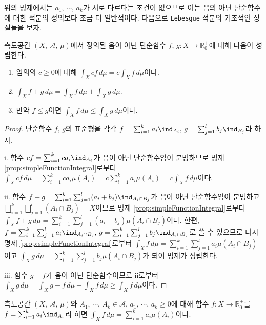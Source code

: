 위의 명제에서는 $a_1,\,\cdots,\,a_k$가 서로 다르다는 조건이 없으므로 이는 음의 아닌 단순함수에 대한 적분의 정의보다 조금 더 일반적이다. 다음으로 \texttt{Lebesgue} 적분의 기초적인 성질들을 보자.

\begin{proposition}
    측도공간 $(X,\,\mathcal{A},\,\mu)$에서 정의된 음이 아닌 단순함수 $f,\,g:X\to\mathbb{R}^+_0$에 대해 다음이 성립한다.
    \begin{enumerate}
        \item 임의의 $c\geq0$에 대해 $\int_Xcf\,d\mu=c\int_Xf\,d\mu$이다.
        \item $\int_Xf+g\,d\mu=\int_Xf\,d\mu+\int_Xg\,d\mu$.
        \item 만약 $f\leq g$이면 $\int_Xf\,d\mu\leq\int_Xg\,d\mu$이다.
    \end{enumerate}
\end{proposition}

\begin{proof}
    단순함수 $f,\,g$의 표준형을 각각 $f=\sum_{i=1}^ka_i\ind_{A_i},\,g=\sum_{j=1}^lb_j\ind_{B_j}$라 하자.

    i. 함수 $cf=\sum_{i=1}^kca_i\ind_{A_i}$가 음이 아닌 단순함수임이 분명하므로 명제 \ref{prop:simpleFunctionIntegral}로부터 $\int_Xcf\,d\mu=\sum_{i=1}^kca_i\mu(A_i)=c\sum_{i=1}^ka_i\mu(A_i)=c\int_Xf\,d\mu$이다.

    ii. 함수 $f+g=\sum_{i=1}^k\sum_{j=1}^l(a_i+b_j)\ind_{A_i\cap B_j}$가 음이 아닌 단순함수임이 분명하고 $\bigsqcup_{i=1}^k\bigsqcup_{j=1}^l(A_i\cap B_j)=X$이므로 명제 \ref{prop:simpleFunctionIntegral}로부터 $\int_Xf+g\,d\mu=\sum_{i=1}^k\sum_{j=1}^l(a_i+b_j)\mu(A_i\cap B_j)$이다. 한편, $f=\sum_{i=1}^k\sum_{j=1}^la_i\ind_{A_i\cap B_j},\,g=\sum_{i=1}^k\sum_{j=1}^lb_j\ind_{A_i\cap B_j}$로 쓸 수 있으므로 다시 명제 \ref{prop:simpleFunctionIntegral}로부터 $\int_Xf\,d\mu=\sum_{i=1}^k\sum_{j=1}^la_i\mu(A_i\cap B_j)$이고 $\int_Xg\,d\mu=\sum_{i=1}^k\sum_{j=1}^lb_j\mu(A_i\cap B_j)$가 되어 명제가 성립한다.

    iii. 함수 $g-f$가 음이 아닌 단순함수이므로 ii로부터 $\int_Xg\,d\mu=\int_Xg-f\,d\mu+\int_Xf\,d\mu\geq\int_Xf\,d\mu$이다.
\end{proof}

\begin{corollary}
    측도공간 $(X,\,\mathcal{A},\,\mu)$와 $A_1,\,\cdots,\,A_k\in\mathcal{A},\,a_1,\,\cdots,\,a_k\geq0$에 대해 함수 $f:X\to\mathbb{R}^+_0$를 $f=\sum_{i=1}^ka_i\ind_{A_i}$라 하면 $\int_Xf\,d\mu=\sum_{i=1}^ka_i\mu(A_i)$이다.
\end{corollary}

